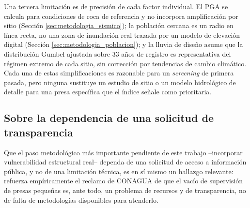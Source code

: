 Una tercera limitaci\'on es de precisi\'on de cada factor individual. El PGA se calcula para condiciones de roca de referencia y no incorpora amplificaci\'on por sitio (Secci\'on \ref{sec:metodologia_sismico}); la poblaci\'on cercana es un radio en l\'inea recta, no una zona de inundaci\'on real trazada por un modelo de elevaci\'on digital (Secci\'on \ref{sec:metodologia_poblacion}); y la lluvia de dise\~no asume que la distribuci\'on Gumbel ajustada sobre 33 a\~nos de registro es representativa del r\'egimen extremo de cada sitio, sin correcci\'on por tendencias de cambio clim\'atico. Cada una de estas simplificaciones es razonable para un \emph{screening} de primera pasada, pero ninguna sustituye un estudio de sitio o un modelo hidrol\'ogico de detalle para una presa espec\'ifica que el \'indice se\~nale como prioritaria.

\subsection{Sobre la dependencia de una solicitud de transparencia}

Que el paso metodol\'ogico m\'as importante pendiente de este trabajo --incorporar vulnerabilidad estructural real-- dependa de una solicitud de acceso a informaci\'on p\'ublica, y no de una limitaci\'on t\'ecnica, es en s\'i mismo un hallazgo relevante: refuerza emp\'iricamente el reclamo de CONAGUA de que el vac\'io de supervisi\'on de presas peque\~nas es, ante todo, un problema de recursos y de transparencia, no de falta de metodolog\'ias disponibles para atenderlo.
